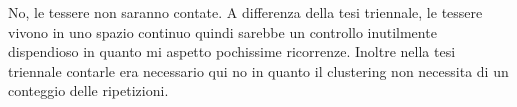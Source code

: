 \begin{note}
	No, le tessere non saranno contate. A differenza della tesi triennale, le tessere vivono in uno spazio continuo quindi sarebbe un controllo inutilmente dispendioso in quanto mi aspetto pochissime ricorrenze. Inoltre nella tesi triennale contarle era necessario qui no in quanto il clustering non necessita di un conteggio delle ripetizioni.
\end{note}
